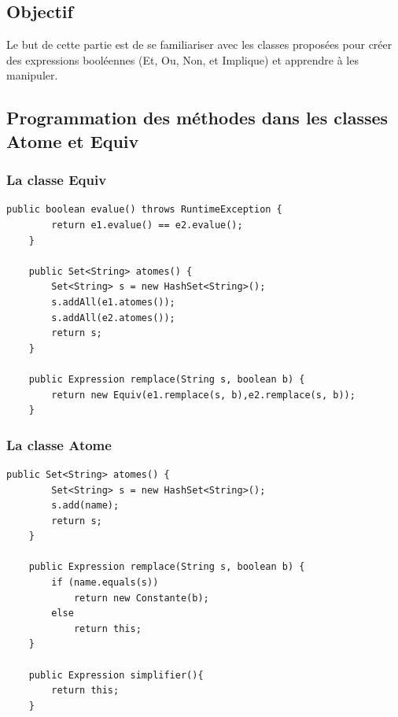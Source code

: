 \documentclass{article}
\begin{document}
\subsection{Objectif}
Le but de cette partie est de se familiariser avec les classes proposées pour créer des expressions booléennes (Et, Ou, Non, et Implique) et apprendre à les manipuler.
\subsection{Programmation des méthodes dans les classes Atome et Equiv}
\subsubsection{La classe Equiv}
\begin{verbatim}
public boolean evalue() throws RuntimeException {
		return e1.evalue() == e2.evalue();
	}

	public Set<String> atomes() {
		Set<String> s = new HashSet<String>();
		s.addAll(e1.atomes());
		s.addAll(e2.atomes());
		return s;
	}

	public Expression remplace(String s, boolean b) {
		return new Equiv(e1.remplace(s, b),e2.remplace(s, b));
	}
\end{verbatim}
\subsubsection{La classe Atome}
\begin{verbatim}
public Set<String> atomes() {
		Set<String> s = new HashSet<String>();
		s.add(name);
		return s;
	}

	public Expression remplace(String s, boolean b) {
		if (name.equals(s))
			return new Constante(b);
		else
			return this;
	}

	public Expression simplifier(){
		return this;
	}
\end{verbatim}
\end{document}
